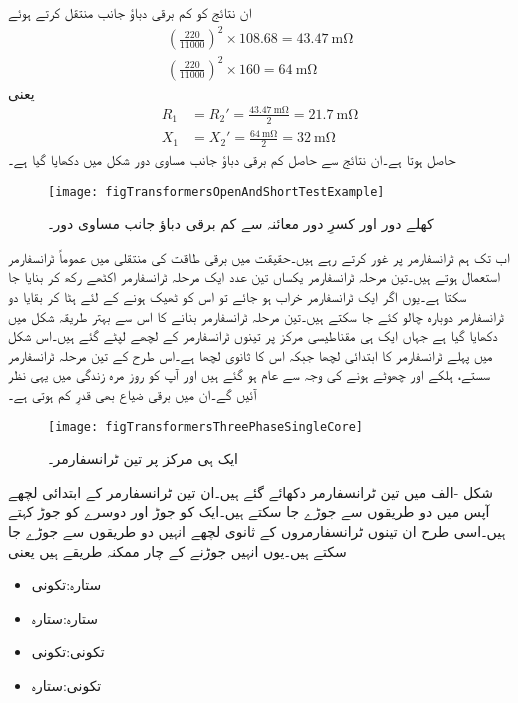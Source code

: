 ان نتائج کو کم برقی دباؤ جانب منتقل کرتے ہوئے 
\begin{align*}
\left(\frac{220}{11000} \right)^2 \times 108.68=\SI{43.47}{\milli \ohm}\\
\left(\frac{220}{11000} \right)^2 \times 160=\SI{64}{\milli \ohm}
\end{align*}
یعنی
\begin{align*}
R_1&=R_2'=\frac{\SI{43.47}{\milli \ohm}}{2}=\SI{21.7}{\milli \ohm}\\
X_1&=X_2'=\frac{\SI{64}{\milli \ohm}}{2}=\SI{32}{\milli \ohm}
\end{align*}
حاصل ہوتا ہے۔ان نتائج سے حاصل کم برقی دباؤ جانب مساوی دور شکل  میں دکھایا گیا ہے۔
\begin{figure}
\centering
\texttt{[image: figTransformersOpenAndShortTestExample]}
\caption{کھلے دور اور کسرِ دور معائنہ سے کم برقی دباؤ جانب  مساوی دور۔}
\label{شکل_ٹرانسفارمر_کھلے_سرے_کسر_دور_مثال}
\end{figure}
%
اب تک ہم   ٹرانسفارمر پر غور کرتے رہے ہیں۔حقیقت میں برقی طاقت کی منتقلی میں عموماً  ٹرانسفارمر استعمال ہوتے ہیں۔تین مرحلہ ٹرانسفارمر یکساں تین عدد  ایک مرحلہ  ٹرانسفارمر اکٹھے رکھ کر بنایا جا سکتا ہے۔یوں اگر ایک ٹرانسفارمر خراب ہو جائے تو اس کو ٹھیک ہونے کے لئے ہٹا کر بقایا دو ٹرانسفارمر دوبارہ چالو کئے جا سکتے ہیں۔تین مرحلہ ٹرانسفارمر بنانے کا اس سے بہتر طریقہ شکل  میں دکھایا گیا ہے جہاں ایک ہی مقناطیسی مرکز پر تینوں ٹرانسفارمر کے لچھے لپٹے گئے ہیں۔اس شکل میں  پہلے ٹرانسفارمر کا ابتدائی لچھا جبکہ  اس کا ثانوی لچھا ہے۔اس طرح کے تین مرحلہ ٹرانسفارمر سستے، ہلکے اور چھوٹے ہونے کی وجہ سے عام ہو گئے ہیں اور آپ کو روز مرہ زندگی میں یہی نظر آئیں گے۔ان میں برقی ضیاع بھی قدرِ کم ہوتی ہے۔
\begin{figure}
\centering
\texttt{[image: figTransformersThreePhaseSingleCore]}
\caption{ایک ہی مرکز پر تین ٹرانسفارمر۔}
\label{شکل_ٹرانسفارمر_ایک_مرکز_تین-ٹرانسفارمر}
\end{figure}

شکل -الف میں تین ٹرانسفارمر دکھائے گئے ہیں۔ان تین ٹرانسفارمر کے ابتدائی لچھے آپس میں دو طریقوں سے جوڑے جا سکتے ہیں۔ایک کو  جوڑ   اور دوسرے کو  جوڑ     کہتے ہیں۔اسی طرح ان تینوں ٹرانسفارمروں کے ثانوی  لچھے انہیں دو طریقوں سے جوڑے جا سکتے ہیں۔یوں انہیں جوڑنے کے چار ممکنہ طریقے ہیں یعنی
\begin{itemize}
\item
ستارہ:تکونی  \quad {}
\item
ستارہ:ستارہ \quad  {}
\item
تکونی:تکونی \quad  {}
\item
تکونی:ستارہ  \quad  {}
\end{itemize}

